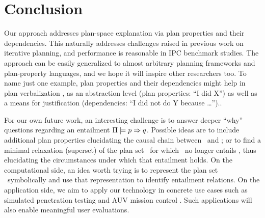 \section{Conclusion}
\label{conclusion}



Our approach addresses plan-space explanation via plan properties and
their dependencies. This naturally addresses challenges raised in
previous work on iterative planning, and performance is reasonable in
IPC benchmark studies. The approach can be easily generalized to
almost arbitrary planning frameworks and plan-property languages, and
we hope it will inspire other researchers too. To name just one
example, plan properties and their dependencies might help in plan
verbalization \cite{rosenthal:etal:ijcai-16}, as an abstraction level
(plan properties: ``I did X'') as well as a means for justification
(dependencies: ``I did not do Y because \dots'')..

For our own future work, an interesting challenge is to answer deeper
``why'' questions regarding an entailment
$\Pi \models p \Rightarrow q$. Possible ideas are to include
additional plan properties elucidating the causal chain between
\prop\ and \propq; or to find a minimal relaxation (superset) of the
plan set \plans\ for which \prop\ no longer entails \propq, thus
elucidating the circumstances under which that entailment holds. On
the computational side, an idea worth trying is to represent the plan
set \plans\ symbolically and use that representation to identify
entailment relations. On the application side, we aim to apply our
technology in concrete use cases such as simulated penetration testing
and AUV mission control \cite{cashmore:etal:icra-14}. Such
applications will also enable meaningful user evaluations. 

%


